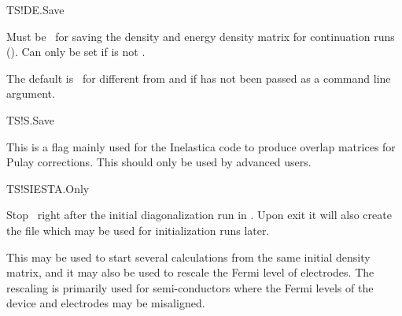 \begin{fdflogicalT}{TS!DE.Save}

  Must be \fdftrue\ for saving the density and energy density matrix
  for continuation runs (). Can only be set if
   is not .

  The default is \fdffalse\ for  different from
   and if  has not been passed as a
  command line argument.

\end{fdflogicalT}  

\begin{fdflogicalF}{TS!S.Save}

  This is a flag mainly used for the Inelastica code to produce
  overlap matrices for Pulay corrections. This should only be used by
  advanced users.

\end{fdflogicalF}


\begin{fdflogicalF}{TS!SIESTA.Only}

  Stop \tsiesta\ right after the initial diagonalization run in
  \siesta. Upon exit it will also create the  file which
  may be used for initialization runs later.

  This may be used to start several calculations from the same initial
  density matrix, and it may also be used to rescale the Fermi level
  of electrodes. The rescaling is primarily used for semi-conductors
  where the Fermi levels of the device and electrodes may be
  misaligned. 

\end{fdflogicalF}


